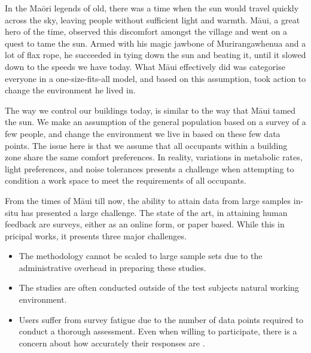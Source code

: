 
In the Ma\={o}ri legends of old, there was a time when the sun would travel quickly across the sky, leaving people without sufficient light and warmth. M\={a}ui, a great hero of the time, observed this discomfort amongst the village and went on a quest to tame the sun. Armed with his magic jawbone of Murirangawhenua and a lot of flax rope, he succeeded in tying down the sun and beating it, until it slowed down to the speeds we have today. What M\={a}ui effectively did was categorise everyone in a one-size-fits-all model, and based on this assumption, took action to change the environment he lived in. 

The way we control our buildings today, is similar to the way that M\={a}ui tamed the sun. We make an assumption of the general population based on a survey of a few people, and change the environment we live in based on these few data points. The issue here is that we assume that all occupants within a building zone share the same comfort preferences. In reality, variations in metabolic rates, light preferences, and noise tolerances presents a challenge when attempting to condition a work space to meet the requirements of all occupants. 



From the times of M\={a}ui till now, the ability to attain data from large samples in-situ has presented a large challenge. The state of the art, in attaining human feedback are surveys, either as an online form, or paper based. While this in pricipal works, it presents three major challenges.

\begin{itemize}
  \item The methodology cannot be scaled to large sample sets due to the administrative overhead in preparing these studies.
  \item The studies are often conducted outside of the test subjects natural working environment.
  \item Users suffer from survey fatigue \cite{porter2004multiple} due to the number of data points required to conduct a thorough assessment. Even when willing to participate, there is a concern about how accurately their responses are \cite{Clear2018}.
\end{itemize}



